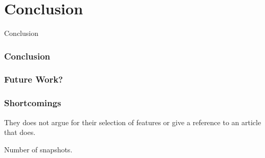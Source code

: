 \section{Conclusion}

\begin{frame}
\begin{center}
     	\huge Conclusion
     \end{center}
\end{frame}

\begin{frame}
\frametitle{Conclusion}

\end{frame}

\begin{frame}
\frametitle{Future Work?}
\end{frame}

\begin{frame}
\frametitle{Shortcomings}
They does not argue for their selection of features or give a reference to an article that does.

Number of snapshots.
\end{frame}
